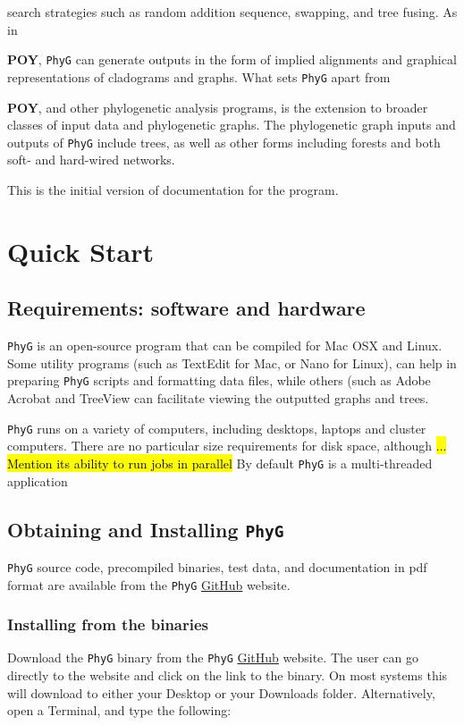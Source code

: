 \documentclass[11pt]{book}
\newcommand{\phyg}{\texttt{PhyG} }
\begin{document}
	search strategies such as random addition sequence, swapping, and tree fusing. As in {\textbf{POY}, 
	\phyg can generate outputs in the form of implied alignments and graphical representations of 
	cladograms and graphs. What sets \phyg apart from {\textbf{POY}, and other phylogenetic 
	analysis programs, is the extension to broader classes of input data and phylogenetic graphs. 
	The phylogenetic graph inputs and outputs of \texttt{PhyG} include trees, as well as other forms 
	including forests and both soft- and hard-wired networks.
		
	This is the initial version of documentation for the program.

	\section{Quick Start}
	
		\subsection{Requirements: software and hardware}
		\phyg is an open-source program that can be compiled for Mac OSX and Linux. Some 
		utility programs (such as TextEdit for Mac, or Nano for Linux), can help in preparing 
		\phyg scripts and formatting data files, while others (such as Adobe Acrobat and TreeView 
		\citep{page1996} can facilitate viewing the outputted graphs and trees.
		
		\phyg runs on a variety of computers, including desktops, laptops and cluster computers.
		There are no particular size requirements for disk space, although \hl{...}\\
		\hl{Mention its ability to run jobs in parallel} By default \phyg is a multi-threaded application
		
		\subsection{Obtaining and Installing \phyg}
		\phyg source code, precompiled binaries, test data, and documentation in pdf format 
		are available from the \phyg \href{https://github.com/amnh/PhyGraph}{GitHub} website.

		\subsubsection{Installing from the binaries}
		Download the \phyg binary from the \phyg \href{https://github.com/amnh/PhyGraph}{GitHub} 
		website. The user can go directly to the website and click on the link to the binary. On most 
		systems this will download to either your Desktop or your Downloads folder. Alternatively, 
		open a Terminal, and type the following:
		
}}
\end{document}
